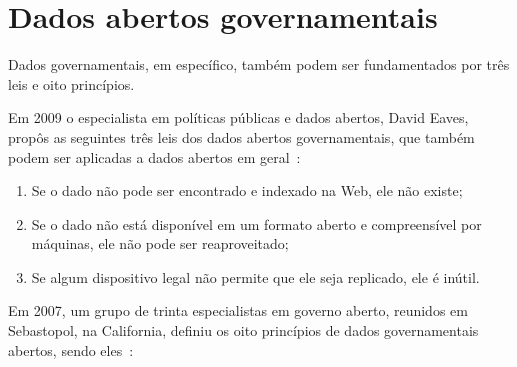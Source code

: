 \section{Dados abertos governamentais}
Dados governamentais, em específico, também podem ser fundamentados por três leis e oito princípios.

Em 2009 o especialista em políticas públicas e dados abertos, David Eaves, propôs as seguintes três leis dos dados abertos governamentais, que também podem ser aplicadas a dados abertos em geral~\cite{eaveslaws}:

\begin{enumerate}
\item Se o dado não pode ser encontrado e indexado na Web, ele não existe;

\item Se o dado não está disponível em um formato aberto e compreensível por máquinas, ele não pode ser reaproveitado;

\item Se algum dispositivo legal não permite que ele seja replicado, ele é inútil.

\end{enumerate}

Em 2007, um grupo de trinta especialistas em governo aberto, reunidos em Sebastopol, na California, definiu os oito princípios de dados governamentais abertos, sendo eles~\cite{opengovdata}:

